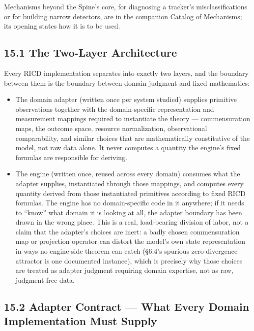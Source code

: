 \documentclass[
]{article}
\begin{document}
Mechanisms beyond the Spine's core, for diagnosing a tracker's
misclassifications or for building narrow detectors, are in the
companion Catalog of Mechanisms; its opening states how it is to be
used.

\hypertarget{the-two-layer-architecture}{%
\subsection{15.1 The Two-Layer
Architecture}\label{the-two-layer-architecture}}

Every RICD implementation separates into exactly two layers, and the
boundary between them is the boundary between domain judgment and fixed
mathematics:

\begin{itemize}
\item
  The domain adapter (written once per system studied) supplies
  primitive observations together with the domain-specific
  representation and measurement mappings required to instantiate the
  theory --- commensuration maps, the outcome space, resource
  normalization, observational comparability, and similar choices that
  are mathematically constitutive of the model, not raw data alone. It
  never computes a quantity the engine's fixed formulas are responsible
  for deriving.
\item
  The engine (written once, reused across every domain) consumes what
  the adapter supplies, instantiated through those mappings, and
  computes every quantity derived from those instantiated primitives
  according to fixed RICD formulas. The engine has no domain-specific
  code in it anywhere; if it needs to ``know'' what domain it is looking
  at all, the adapter boundary has been drawn in the wrong place. This
  is a real, load-bearing division of labor, not a claim that the
  adapter's choices are inert: a badly chosen commensuration map or
  projection operator can distort the model's own state representation
  in ways no engine-side theorem can catch (§6.4's spurious
  zero-divergence attractor is one documented instance), which is
  precisely why those choices are treated as adapter judgment requiring
  domain expertise, not as raw, judgment-free data.
\end{itemize}

\hypertarget{adapter-contract-what-every-domain-implementation-must-supply}{%
\subsection{15.2 Adapter Contract --- What Every Domain Implementation
Must
Supply}\label{adapter-contract-what-every-domain-implementation-must-supply}}
\end{document}
